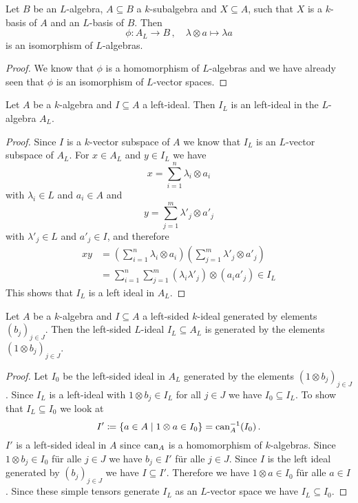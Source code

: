 \begin{corollary}\label{corollary: inclusion to bijection algebras}
  Let $B$ be an $L$-algebra, $A \subseteq B$ a $k$-subalgebra and $X \subseteq A$, such that $X$ is a $k$-basis of $A$ and an $L$-basis of $B$.
  Then
  \[
            \phi
    \colon  A_L
    \to     B \,,
    \quad   \lambda \otimes a
    \mapsto \lambda a
  \]
  is an isomorphism of $L$-algebras.
\end{corollary}
\begin{proof}
  We know that $\phi$ is a homomorphism of $L$-algebras and we have already seen that $\phi$ is an isomorphism of $L$-vector spaces.
\end{proof}


\begin{lemma}
  Let $A$ be a $k$-algebra and $I \subseteq A$ a left-ideal.
  Then $I_L$ is an left-ideal in the $L$-algebra $A_L$.
\end{lemma}
\begin{proof}
  Since $I$ is a $k$-vector subspace of $A$ we know that $I_L$ is an $L$-vector subspace of $A_L$.
  For $x \in A_L$ and $y \in I_L$ we have
  \[
    x = \sum_{i=1}^n \lambda_i \otimes a_i
  \]
  with $\lambda_i \in L$ and $a_i \in A$ and
  \[
    y = \sum_{j=1}^m \lambda'_j \otimes a'_j
  \]
  with $\lambda'_j \in L$ and $a'_j \in I$, and therefore
  \begin{align*}
        xy
    &=  \left( \sum_{i=1}^n \lambda_i \otimes a_i \right)
        \left( \sum_{j=1}^m \lambda'_j \otimes a'_j \right) \\
    &=  \sum_{i=1}^n \sum_{j=1}^m (\lambda_i \lambda'_j) \otimes (a_i a'_j)
    \in I_L
  \end{align*}
  This shows that $I_L$ is a left ideal in $A_L$.
\end{proof}


\begin{lemma}
  Let $A$ be a $k$-algebra and $I \subseteq A$ a left-sided $k$-ideal generated by elements $(b_j)_{j \in J}$.
  Then the left-sided $L$-ideal $I_L \subseteq A_L$ is generated by the elements $(1 \otimes b_j)_{j \in J}$.
\end{lemma}
\begin{proof}
  Let $I_0$ be the left-sided ideal in $A_L$ generated by the elements $(1 \otimes b_j)_{j \in J}$.
  Since $I_L$ is a left-ideal with $1 \otimes b_j \in I_L$ for all $j \in J$ we have $I_0 \subseteq I_L$.
  To show that $I_L \subseteq I_0$ we look at
  \[
              I'
    \coloneqq \{
                a \in A
              \mid
                1 \otimes a \in I_0
              \}
    =         \operatorname{can}_A^{-1}(I_0) \,.
  \]
  $I'$ is a left-sided ideal in $A$ since $\operatorname{can}_A$ is a homomorphism of $k$-algebras.
  Since $1 \otimes b_j \in I_0$ für alle $j \in J$ we have $b_j \in I'$ für alle $j \in J$.
  Since $I$ is the left ideal generated by $(b_j)_{j \in J}$ we have $I \subseteq I'$.
  Therefore we have $1 \otimes a \in I_0$ für alle $a \in I$.
  Since these simple tensors generate $I_L$ as an $L$-vector space we have $I_L \subseteq I_0$.
\end{proof}


